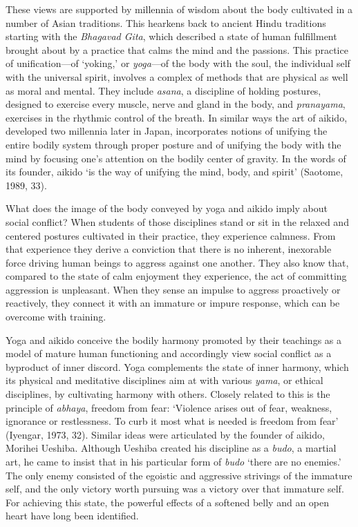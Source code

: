 These views are supported by millennia of wisdom about the body cultivated in a number of Asian traditions. This hearkens back to ancient Hindu traditions starting with the \emph{Bhagavad Gita}, which described a state of human fulfillment brought about by a practice that calms the mind and the passions. This practice of unification---of `yoking,' or \emph{yoga}---of the body with the soul, the individual self with the universal spirit, involves a complex of methods that are physical as well as moral and mental. They include \emph{asana}, a discipline of holding postures, designed to exercise every muscle, nerve and gland in the body, and \emph{pranayama}, exercises in the rhythmic control of the breath. In similar ways the art of aikido, developed two millennia later in Japan, incorporates notions of unifying the entire bodily system through proper posture and of unifying the body with the mind by focusing one's attention on the bodily center of gravity. In the words of its founder, aikido `is the way of unifying the mind, body, and spirit' (Saotome, 1989, 33).

What does the image of the body conveyed by yoga and aikido imply about social conflict? When students of those disciplines stand or sit in the relaxed and centered postures cultivated in their practice, they experience calmness. From that experience they derive a conviction that there is no inherent, inexorable force driving human beings to aggress against one another. They also know that, compared to the state of calm enjoyment they experience, the act of committing aggression is unpleasant. When they sense an impulse to aggress proactively or reactively, they connect it with an immature or impure response, which can be overcome with training.

Yoga and aikido conceive the bodily harmony promoted by their teachings as a model of mature human functioning and accordingly view social conflict as a byproduct of inner discord. Yoga complements the state of inner harmony, which its physical and meditative disciplines aim at with various \emph{yama}, or ethical disciplines, by cultivating harmony with others. Closely related to this is the principle of \emph{abhaya}, freedom from fear: `Violence arises out of fear, weakness, ignorance or restlessness. To curb it most what is needed is freedom from fear' (Iyengar, 1973, 32). Similar ideas were articulated by the founder of aikido, Morihei Ueshiba. Although Ueshiba created his discipline as a \emph{budo}, a martial art, he came to insist that in his particular form of \emph{budo} `there are no enemies.' The only enemy consisted of the egoistic and aggressive strivings of the immature self, and the only victory worth pursuing was a victory over that immature self. For achieving this state, the powerful effects of a softened belly and an open heart have long been identified.

